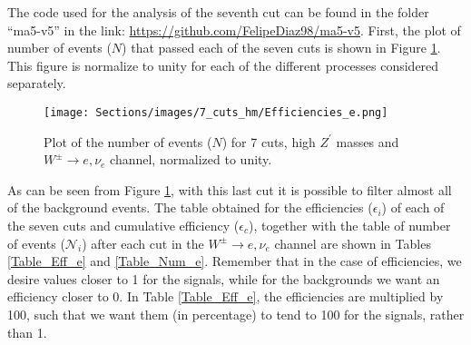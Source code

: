 The code used for the analysis of the seventh cut can be found in the folder ``ma5-v5'' in the link: \url{https://github.com/FelipeDiaz98/ma5-v5}. First, the plot of number of events ($N$) that passed each of the seven cuts is shown in Figure \ref{7cutsHm_Eff_e}. This figure is normalize to unity for each of the different processes considered separately.

\begin{figure}[ht!]
    \centering
    \texttt{[image: Sections/images/7\_cuts\_hm/Efficiencies\_e.png]}
    \caption{Plot of the number of events ($N$) for 7 cuts, high $Z^{\prime}$ masses and $W^{\pm}\rightarrow e, \nu_e$ channel, normalized to unity.}
    \label{7cutsHm_Eff_e}
\end{figure}

As can be seen from Figure \ref{7cutsHm_Eff_e}, with this last cut it is possible to filter almost all of the background events. The table obtained for the efficiencies ($\epsilon_i$) of each of the seven cuts and cumulative efficiency ($\epsilon_c$), together with the table of number of events ($\mathcal{N}_i$) after each cut in the $W^{\pm} \rightarrow e, \nu_e$ channel are shown in Tables \ref{Table_Eff_e} and \ref{Table_Num_e}. Remember that in the case of efficiencies, we desire values closer to 1 for the signals, while for the backgrounds we want an efficiency closer to 0. In Table \ref{Table_Eff_e}, the efficiencies are multiplied by 100, such that we want them (in percentage) to tend to 100 for the signals, rather than 1.

